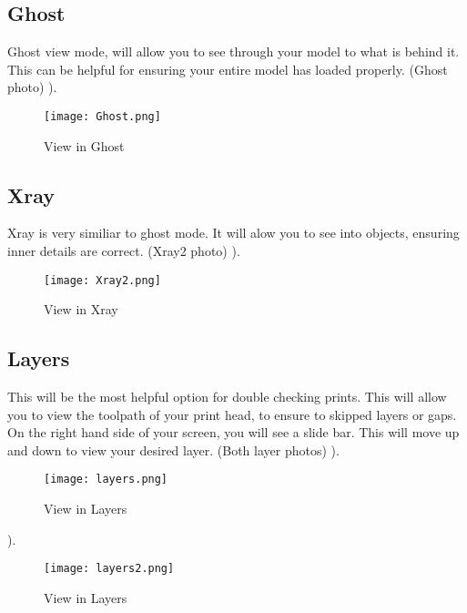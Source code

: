 \subsection{Ghost}

Ghost view mode, will allow you to see through your model to what is behind it. This can be helpful for ensuring your entire model has loaded properly. (Ghost photo)
\pageref{fig:Rotating}).
\begin{figure}[hbt]
\centering
\texttt{[image: Ghost.png]}
\caption{View in Ghost}
\label{fig:Ghost View}
\end{figure}

\subsection{Xray}

Xray is very similiar to ghost mode. It will alow you to see into objects, ensuring inner details are correct. (Xray2 photo)
\pageref{fig:Xray}).
\begin{figure}[hbt]
\centering
\texttt{[image: Xray2.png]}
\caption{View in Xray}
\label{fig:Xray View}
\end{figure}

\subsection{Layers}

This will be the most helpful option for double checking prints. This will allow you to view the toolpath of your print head, to ensure to skipped layers or gaps. On the right hand side of your screen, you will see a slide bar. This will move up and down to view your desired layer. (Both layer photos)
\pageref{fig:Layers}).
\begin{figure}[hbt]
\centering
\texttt{[image: layers.png]}
\caption{View in Layers}
\label{fig:Layers View}
\end{figure}
\pageref{fig:Mid Layers}).
\begin{figure}[hbt]
\centering
\texttt{[image: layers2.png]}
\caption{View in Layers}
\label{fig:Mid Layers View}
\end{figure}

